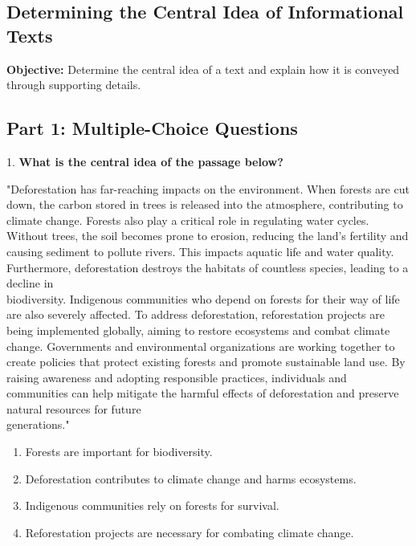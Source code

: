 \documentclass[12pt]{article}
\begin{document}
\subsection*{Determining the Central Idea of Informational Texts}
\onehalfspacing

\begin{tcolorbox}[colframe=black!40, colback=gray!0, title=Learning Objective]
\textbf{Objective:} Determine the central idea of a text and explain how it is conveyed through supporting details.
\end{tcolorbox}

\subsection*{Part 1: Multiple-Choice Questions}

1. \textbf{What is the central idea of the passage below? } 

"Deforestation has far-reaching impacts on the environment. When forests are cut down, the carbon stored in trees is released into the atmosphere, contributing to climate change. Forests also play a critical role in regulating water cycles. Without trees, the soil becomes prone to erosion, reducing the land’s fertility and causing sediment to pollute rivers. This impacts aquatic life and water quality. Furthermore, deforestation destroys the habitats of countless species, leading to a decline in \\biodiversity. Indigenous communities who depend on forests for their way of life are also severely affected. To address deforestation, reforestation projects are being implemented globally, aiming to restore ecosystems and combat climate change. Governments and environmental organizations are working together to create policies that protect existing forests and promote sustainable land use. By raising awareness and adopting responsible practices, individuals and communities can help mitigate the harmful effects of deforestation and preserve natural resources for future \\generations."  
\begin{enumerate}[label=\Alph*.]
    \item Forests are important for biodiversity.  
    \item Deforestation contributes to climate change and harms ecosystems.  
    \item Indigenous communities rely on forests for survival.  
    \item Reforestation projects are necessary for combating climate change.  
\end{enumerate}
\end{document}
